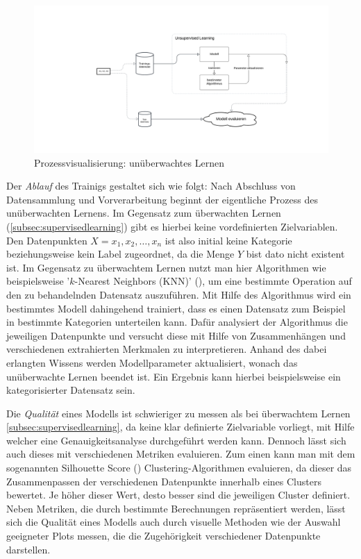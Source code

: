 \begin{figure}[H]\label{img:unsupervisedworkflow}
	\hspace{-15mm}
	\centering
	\includegraphics[width=0.8\linewidth]{Bilder/UnsupervisedLearning.png}
	\caption{Prozessvisualisierung: unüberwachtes Lernen}
\end{figure}
Der \textit{Ablauf} des Trainigs gestaltet sich wie folgt: Nach Abschluss von Datensammlung und Vorverarbeitung beginnt der eigentliche Prozess des unüberwachten Lernens. Im Gegensatz zum überwachten Lernen (\ref{subsec:supervisedlearning}) gibt es hierbei keine vordefinierten Zielvariablen. Den Datenpunkten $X = x_1, x_2, \ldots, x_n$ ist also initial keine Kategorie beziehungsweise kein Label zugeordnet, da die Menge $Y$ bist dato nicht existent ist. Im Gegensatz zu überwachtem Lernen nutzt man hier Algorithmen wie beispielsweise '$k$-Nearest Neighbors (KNN)' (\cite[38]{joshi_machine_2020}), um eine bestimmte Operation auf den zu behandelnden Datensatz auszuführen. Mit Hilfe des Algorithmus wird ein bestimmtes Modell dahingehend trainiert, dass es einen Datensatz zum Beispiel in bestimmte Kategorien unterteilen kann. Dafür analysiert der Algorithmus die jeweiligen Datenpunkte und versucht diese mit Hilfe von Zusammenhängen und verschiedenen extrahierten Merkmalen zu interpretieren. Anhand des dabei erlangten Wissens werden Modellparameter aktualisiert, wonach das unüberwachte Lernen beendet ist. Ein Ergebnis kann hierbei beispielsweise ein kategorisierter Datensatz sein.

Die  \textit{Qualität} eines Modells ist schwieriger zu messen als bei überwachtem Lernen \ref{subsec:supervisedlearning}, da keine klar definierte Zielvariable vorliegt, mit Hilfe welcher eine Genauigkeitsanalyse durchgeführt werden kann. Dennoch lässt sich auch dieses mit verschiedenen Metriken evaluieren. Zum einen kann man mit dem sogenannten Silhouette Score (\cite{shahapure_cluster_2020}) Clustering-Algorithmen evaluieren, da dieser das Zusammenpassen der verschiedenen Datenpunkte innerhalb eines Clusters bewertet. Je höher dieser Wert, desto besser sind die jeweiligen Cluster definiert. Neben Metriken, die durch bestimmte Berechnungen repräsentiert werden, lässt sich die Qualität eines Modells auch durch visuelle Methoden wie der Auswahl geeigneter Plots messen, die die Zugehörigkeit verschiedener Datenpunkte darstellen.
